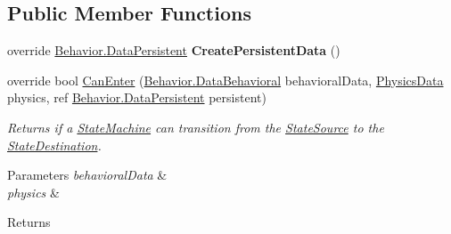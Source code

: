 \subsection*{Public Member Functions}
\begin{DoxyCompactItemize}
\item 
\hypertarget{class_skyrates_1_1_a_i_1_1_state_1_1_transition_1_1_transition_distance_to_target_ac70e27bd4965afe3278f5f7268fa30af}{override \hyperlink{class_skyrates_1_1_a_i_1_1_behavior_1_1_data_persistent}{Behavior.\-Data\-Persistent} {\bfseries Create\-Persistent\-Data} ()}\label{class_skyrates_1_1_a_i_1_1_state_1_1_transition_1_1_transition_distance_to_target_ac70e27bd4965afe3278f5f7268fa30af}

\item 
\hypertarget{class_skyrates_1_1_a_i_1_1_state_1_1_transition_1_1_transition_distance_to_target_a894564a64358ce4924f3b64bfef90662}{override bool \hyperlink{class_skyrates_1_1_a_i_1_1_state_1_1_transition_1_1_transition_distance_to_target_a894564a64358ce4924f3b64bfef90662}{Can\-Enter} (\hyperlink{class_skyrates_1_1_a_i_1_1_behavior_1_1_data_behavioral}{Behavior.\-Data\-Behavioral} behavioral\-Data, \hyperlink{class_skyrates_1_1_physics_1_1_physics_data}{Physics\-Data} physics, ref \hyperlink{class_skyrates_1_1_a_i_1_1_behavior_1_1_data_persistent}{Behavior.\-Data\-Persistent} persistent)}\label{class_skyrates_1_1_a_i_1_1_state_1_1_transition_1_1_transition_distance_to_target_a894564a64358ce4924f3b64bfef90662}

\begin{DoxyCompactList}\small\item\em Returns if a \hyperlink{class_skyrates_1_1_a_i_1_1_state_1_1_state_machine}{State\-Machine} can transition from the \hyperlink{class_skyrates_1_1_a_i_1_1_state_1_1_state_transition_a15c97c73b5e83f2bda77c5f4fb2521c6}{State\-Source} to the \hyperlink{class_skyrates_1_1_a_i_1_1_state_1_1_state_transition_a445177b14011fbc85aec78ecd04680f8}{State\-Destination}. 


\begin{DoxyParams}{Parameters}
{\em behavioral\-Data} & \\
\hline
{\em physics} & \\
\hline
\end{DoxyParams}
\begin{DoxyReturn}{Returns}

\end{DoxyReturn}
 \end{DoxyCompactList}\end{DoxyCompactItemize}
